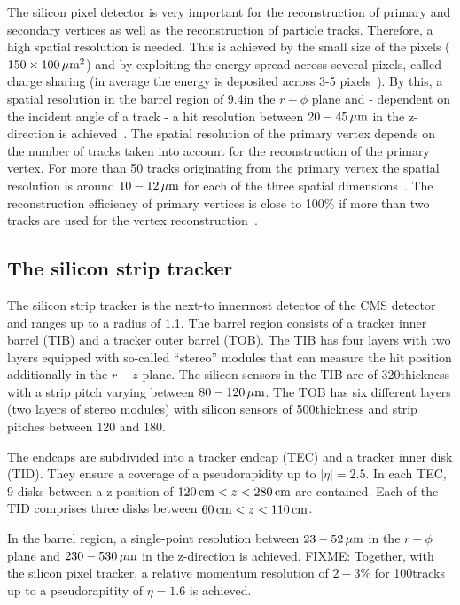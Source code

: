 The silicon pixel detector is very important for the reconstruction of primary and secondary vertices as well as the reconstruction of particle tracks.
Therefore, a high spatial resolution is needed.
This is achieved by the small size of the pixels ($ 150 \times 100 \,\mu\text{m}^2$) and by exploiting the energy spread across several pixels, called charge sharing (in average the energy is deposited across 3-5 pixels~\cite{bib:TWIKI:PixelClusterSize}).
By this, a spatial resolution in the barrel region of 9.4\mum in the $r - \phi$ plane and - dependent on the incident angle of a track - a hit resolution between $20-45\,\mu\text{m}$ in the z-direction is achieved~\cite{bib:CMS:tracking_8TeV}. 
The spatial resolution of the primary vertex depends on the number of tracks taken into account for the reconstruction of the primary vertex.
For more than 50 tracks originating from the primary vertex the spatial resolution is around $10-12\,\mu\text{m}$ for each of the three spatial dimensions~\cite{bib:CMS:tracking_8TeV}.
The reconstruction efficiency of primary vertices is close to 100\% if more than two tracks are used for the vertex reconstruction~\cite{bib:CMS:tracking_8TeV}.

\subsection*{The silicon strip tracker}
The silicon strip tracker is the next-to innermost detector of the CMS detector and ranges up to a radius of 1.1\m.
The barrel region consists of a tracker inner barrel (TIB) and a tracker outer barrel (TOB).
The TIB has four layers with two layers equipped with so-called ``stereo'' modules that can measure the hit position additionally in the $r-z$ plane.
The silicon sensors in the TIB are of 320\mum thickness with a strip pitch varying between $80-120\,\mu\text{m}$.
The TOB has six different layers (two layers of stereo modules) with silicon sensors of 500\mum thickness and strip pitches between 120 and 180\mum. 

The endcaps are subdivided into a tracker endcap (TEC) and a tracker inner disk (TID).
They ensure a coverage of a pseudorapidity up to $|\eta|=2.5$.
In each TEC, 9 disks between a z-position of $120\,\text{cm} < z < 280\,\text{cm}$ are contained.
Each of the TID comprises three disks between $60\,\text{cm} < z < 110\,\text{cm}$.

In the barrel region, a single-point resolution between $23 - 52\,\mu\text{m}$ in the $r-\phi$ plane and $230 - 530\,\mu\text{m}$  in the z-direction is achieved.
FIXME: Together, with the silicon pixel tracker, a relative momentum resolution of $2-3\%$ for 100\gev tracks up to a pseudorapitity of $\eta = 1.6$ is achieved.


